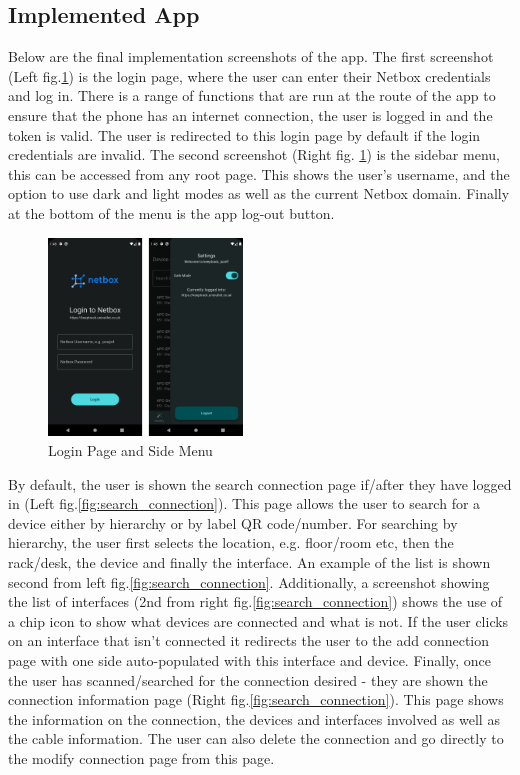\documentclass [11pt,a4paper]{article}
\begin{document}
\subsection{Implemented App}
\label{sec:implemented_app}

Below are the final implementation screenshots of the app. The first screenshot (Left fig.\ref{fig:login}) is the login page, where the user can enter their Netbox credentials and log in. There is a range of functions that are run at the route of the app to ensure that the phone has an internet connection, the user is logged in and the token is valid. The user is redirected to this login page by default if the login credentials are invalid. The second screenshot (Right fig. \ref{fig:login}) is the sidebar menu, this can be accessed from any root page. This shows the user's username, and the option to use dark and light modes as well as the current Netbox domain. Finally at the bottom of the menu is the app log-out button.

\begin{figure}[H]
    \centering
    \includegraphics[width=0.46\textwidth]{images/final_login_menu.png}
    \caption{Login Page and Side Menu}
    \label{fig:login}
\end{figure}

By default, the user is shown the search connection page if/after they have logged in (Left fig.\ref{fig:search_connection}). This page allows the user to search for a device either by hierarchy or by label QR code/number. For searching by hierarchy, the user first selects the location, e.g. floor/room etc, then the rack/desk, the device and finally the interface. An example of the list is shown second from left fig.\ref{fig:search_connection}. Additionally, a screenshot showing the list of interfaces (2nd from right fig.\ref{fig:search_connection}) shows the use of a chip icon to show what devices are connected and what is not. If the user clicks on an interface that isn't connected it redirects the user to the add connection page with one side auto-populated with this interface and device. Finally, once the user has scanned/searched for the connection desired - they are shown the connection information page (Right fig.\ref{fig:search_connection}). This page shows the information on the connection, the devices and interfaces involved as well as the cable information. The user can also delete the connection and go directly to the modify connection page from this page.
\end{document}
